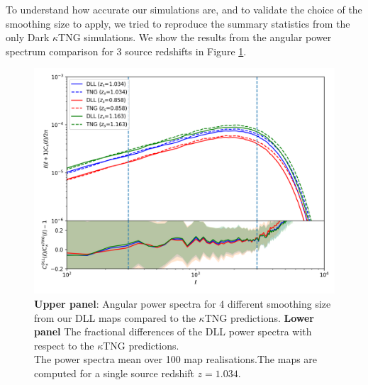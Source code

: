 \documentclass[twocolumn,twocolappendix]{aastex63}
\begin{document}
To understand how accurate our simulations are, and to validate the choice of the smoothing size to apply, we tried to reproduce the summary statistics from the only Dark $\kappa$TNG simulations. 
 We show the results from the angular power spectrum comparison for 3 source redshifts in Figure \ref{fig:clsktng_comp1arc}.
\begin{figure}
    \centering
    \includegraphics[width=\columnwidth]{paper/figures/clsktng_comp1arc.png}
    \caption{
    \textbf{Upper panel}: Angular power spectra for 4 different smoothing size from
our DLL maps compared to the $\kappa$TNG predictions.
 \textbf{Lower panel}
The fractional differences of the DLL power spectra with respect to the $\kappa$TNG predictions. \\
 The power spectra mean over 100 map realisations.The maps are computed for a single source redshift $z=1.034$. }
    \label{fig:clsktng_comp1arc}
\end{figure}
\end{document}
